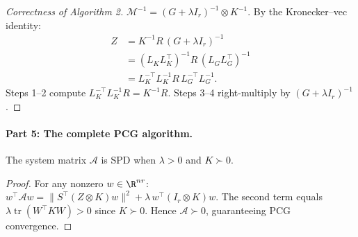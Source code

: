 \begin{proof}[Correctness of Algorithm 2]
$\mathcal{M}^{-1} = (G + \lambda I_r)^{-1}\otimes K^{-1}$. By the Kronecker--vec identity:
\begin{align*}
  Z &= K^{-1}R\,(G + \lambda I_r)^{-1}\\
  &= (L_K L_K^\top)^{-1}R\,(L_G L_G^\top)^{-1}\\
  &= L_K^{-\top}L_K^{-1}R\,L_G^{-\top}L_G^{-1}.
\end{align*}
Steps 1--2 compute $L_K^{-\top}L_K^{-1}R = K^{-1}R$.
Steps 3--4 right-multiply by $(G + \lambda I_r)^{-1}$.
\end{proof}

\paragraph{Part 5: The complete PCG algorithm.}

\begin{theorem}\label{thm:p10-spd}
The system matrix $\mathcal{A}$ is SPD when $\lambda > 0$ and $K \succ 0$.
\end{theorem}

\begin{proof}
For any nonzero $w \in \R^{nr}$:
$w^\top\mathcal{A}w = \|S^\top(Z \otimes K)w\|^2 + \lambda\,w^\top(I_r \otimes K)w$.
The second term equals $\lambda\operatorname{tr}(W^\top KW) > 0$ since $K \succ 0$.
Hence $\mathcal{A} \succ 0$, guaranteeing PCG convergence.
\end{proof}

